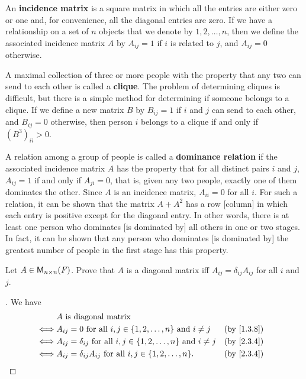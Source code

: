 \begin{defn}\label{2.3.9}
  An \textbf{incidence matrix} is a square matrix in which all the entries are either zero or one and, for convenience, all the diagonal entries are zero.
  If we have a relationship on a set of \(n\) objects that we denote by \(1, 2, \dots, n\), then we define the associated incidence matrix \(A\) by \(A_{i j} = 1\) if \(i\) is related to \(j\), and \(A_{i j} = 0\) otherwise.
\end{defn}

\begin{eg}\label{2.3.10}
  A maximal collection of three or more people with the property that any two can send to each other is called a \textbf{clique}.
  The problem of determining cliques is difficult, but there is a simple method for determining if someone belongs to a clique.
  If we define a new matrix \(B\) by \(B_{i j} = 1\) if \(i\) and \(j\) can send to each other, and \(B_{i j} = 0\) otherwise, then person \(i\) belongs to a clique if and only if \((B^3)_{i i} > 0\).
\end{eg}

\begin{eg}\label{2.3.11}
  A relation among a group of people is called a \textbf{dominance relation} if the associated incidence matrix \(A\) has the property that for all distinct pairs \(i\) and \(j\), \(A_{i j} = 1\) if and only if \(A_{j i} = 0\), that is, given any two people, exactly one of them dominates the other.
  Since \(A\) is an incidence matrix, \(A_{i i} = 0\) for all \(i\).
  For such a relation, it can be shown that the matrix \(A + A^2\) has a row [column] in which each entry is positive except for the diagonal entry.
  In other words, there is at least one person who dominates [is dominated by] all others in one or two stages.
  In fact, it can be shown that any person who dominates [is dominated by] the greatest number of people in the first stage has this property.
\end{eg}

\exercisesection

\setcounter{ex}{9}
\begin{ex}\label{ex:2.3.10}
  Let \(A \in \mathsf{M}_{{n} \times n}({\mathit{F}})\).
  Prove that \(A\) is a diagonal matrix iff \(A_{i j} = \delta_{i j} A_{i j}\) for all \(i\) and \(j\).
\end{ex}

\begin{proof}[]
  We have
  \begin{align*}
         & A \text{ is diagonal matrix}                                                                                              \\
    \iff & A_{i j} = 0 \text{ for all } i, j \in \set{1, 2, \dots, n} \text{ and } i \neq j            &  & \text{(by \cref{1.3.8})} \\
    \iff & A_{i j} = \delta_{i j} \text{ for all } i, j \in \set{1, 2, \dots, n} \text{ and } i \neq j &  & \text{(by \cref{2.3.4})} \\
    \iff & A_{i j} = \delta_{i j} A_{i j} \text{ for all } i, j \in \set{1, 2, \dots, n}.              &  & \text{(by \cref{2.3.4})}
  \end{align*}
\end{proof}


